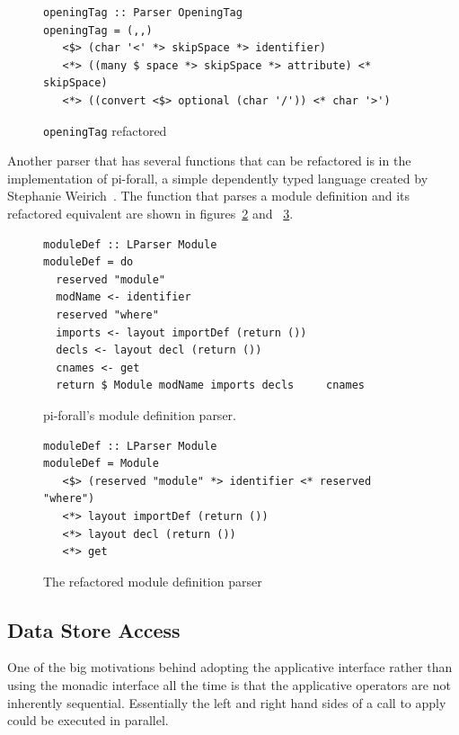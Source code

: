\begin{figure}[t]
\begin{lstlisting}
openingTag :: Parser OpeningTag
openingTag = (,,) 
   <$> (char '<' *> skipSpace *> identifier) 
   <*> ((many $ space *> skipSpace *> attribute) <* skipSpace) 
   <*> ((convert <$> optional (char '/')) <* char '>')
\end{lstlisting}
\caption{\texttt{openingTag} refactored}
\label{openingTag_ref}
\end{figure}

Another parser that has several functions that can be refactored is in the implementation of pi-forall, a simple dependently typed language created by Stephanie Weirich~\citep{piForall}. The function that parses a module definition and its refactored equivalent are shown in figures~\ref{piParse} and ~\ref{piParse_ref}.

\begin{figure}[t]
\begin{lstlisting}
moduleDef :: LParser Module
moduleDef = do
  reserved "module"
  modName <- identifier
  reserved "where"
  imports <- layout importDef (return ())
  decls <- layout decl (return ())
  cnames <- get
  return $ Module modName imports decls     cnames
\end{lstlisting}
\caption{pi-forall's module definition parser.}
\label{piParse}
\end{figure}

\begin{figure}[t]
\begin{lstlisting}
moduleDef :: LParser Module
moduleDef = Module
   <$> (reserved "module" *> identifier <* reserved "where") 
   <*> layout importDef (return ()) 
   <*> layout decl (return ()) 
   <*> get
\end{lstlisting}
\caption{The refactored module definition parser}
\label{piParse_ref}
\end{figure}



\subsection{Data Store Access}

One of the big motivations behind adopting the applicative interface rather than using the monadic interface all the time is that the applicative operators are not inherently sequential. Essentially the left and right hand sides of a call to apply could be executed in parallel. 

